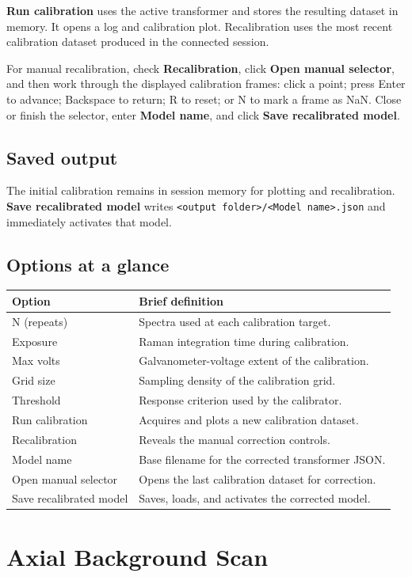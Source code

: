 \documentclass[11pt,oneside]{report}
\newcommand{\ui}[1]{\textbf{#1}}
\newcommand{\code}[1]{\texttt{#1}}
\begin{document}
\ui{Run calibration} uses the active transformer and stores the resulting dataset
in memory. It opens a log and calibration plot. Recalibration uses the most recent
calibration dataset produced in the connected session.

For manual recalibration, check \ui{Recalibration}, click \ui{Open manual selector},
and then work through the displayed calibration frames: click a point; press Enter
to advance; Backspace to return; R to reset; or N to mark a frame as NaN. Close or
finish the selector, enter \ui{Model name}, and click \ui{Save recalibrated model}.

\section*{Saved output}
The initial calibration remains in session memory for plotting and recalibration.
\ui{Save recalibrated model} writes
\code{<output folder>/<Model name>.json} and immediately activates that model.

\section*{Options at a glance}
\begin{longtable}{@{}p{}p{}@{}}
\toprule\textbf{Option} & \textbf{Brief definition}\\\midrule
N (repeats) & Spectra used at each calibration target.\\
Exposure & Raman integration time during calibration.\\
Max volts & Galvanometer-voltage extent of the calibration.\\
Grid size & Sampling density of the calibration grid.\\
Threshold & Response criterion used by the calibrator.\\
Run calibration & Acquires and plots a new calibration dataset.\\
Recalibration & Reveals the manual correction controls.\\
Model name & Base filename for the corrected transformer JSON.\\
Open manual selector & Opens the last calibration dataset for correction.\\
Save recalibrated model & Saves, loads, and activates the corrected model.\\
\bottomrule\end{longtable}

\chapter{Axial Background Scan}
\end{document}
